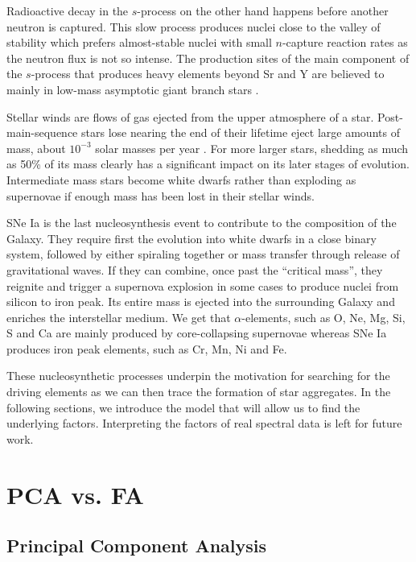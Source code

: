 \documentclass[12pt, letterpaper]{article}
\begin{document}
Radioactive decay in the $s$-process on the other hand happens before another neutron is captured. This slow process produces nuclei close to the valley of stability which prefers almost-stable nuclei with small $n$-capture reaction rates as the neutron flux is not so intense. The production sites of the main component of the $s$-process that produces heavy elements beyond Sr and Y are believed to mainly in low-mass asymptotic giant branch stars \citep{boothroyd2006heavy}.

Stellar winds are flows of gas ejected from the upper atmosphere of a star. Post-main-sequence stars lose nearing the end of their lifetime eject large amounts of mass, about $10^{-3}$ solar masses per year \citep{mattson2011}. For more larger stars, shedding as much as 50\% of its mass clearly has a significant impact on its later stages of evolution. Intermediate mass stars become white dwarfs rather than exploding as supernovae if enough mass has been lost in their stellar winds. 

SNe Ia is the last nucleosynthesis event to contribute to the composition of the Galaxy. They require first the evolution into white dwarfs in a close binary system, followed by either spiraling together or mass transfer through release of gravitational waves. If they can combine, once past the ``critical mass'', they reignite and trigger a supernova explosion in some cases to produce nuclei from silicon to iron peak. Its entire mass is ejected into the surrounding Galaxy and enriches the interstellar medium. We get that $\alpha$-elements, such as O, Ne, Mg, Si, S and Ca are mainly produced by core-collapsing supernovae whereas SNe Ia produces iron peak elements, such as Cr, Mn, Ni and Fe.

These nucleosynthetic processes underpin the motivation for searching for the driving elements as we can then trace the formation of star aggregates. In the following sections, we introduce the model that will allow us to find the underlying factors. Interpreting the factors of real spectral data is left for future work.




\section{PCA vs. FA}

    \subsection{Principal Component Analysis}
    
\end{document}
